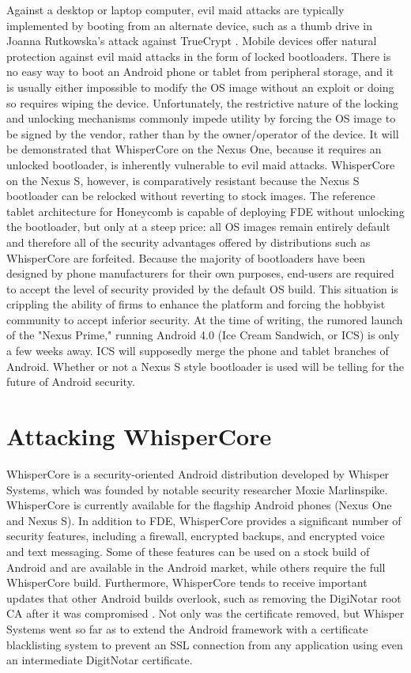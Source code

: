 Against a desktop or laptop computer, evil maid attacks are typically implemented by booting from an alternate device, such as a thumb drive in Joanna Rutkowska's attack against TrueCrypt \cite{evilmaid}. 
Mobile devices offer natural protection against evil maid attacks in the form of locked bootloaders. 
There is no easy way to boot an Android phone or tablet from peripheral storage, and it is usually either impossible to modify the OS image without an exploit or doing so requires wiping the device. 
Unfortunately, the restrictive nature of the locking and unlocking mechanisms commonly impede utility by forcing the OS image to be signed by the vendor, rather than by the owner/operator of the device. It will be demonstrated that WhisperCore on the Nexus One, because it requires an unlocked bootloader, is inherently vulnerable to evil maid attacks. 
WhisperCore on the Nexus S, however, is comparatively resistant because the Nexus S bootloader can be relocked without reverting to stock images. 
The reference tablet architecture for Honeycomb is capable of deploying FDE without unlocking the bootloader, but only at a steep price: all OS images remain entirely default and therefore all of the security advantages offered by distributions such as WhisperCore are forfeited. 
Because the majority of bootloaders have been designed by phone manufacturers for their own purposes, end-users are required to accept the level of security provided by the default OS build. 
This situation is crippling the ability of firms to enhance the platform and forcing the hobbyist community to accept inferior security. 
At the time of writing, the rumored launch of the "Nexus Prime," running Android 4.0 (Ice Cream Sandwich, or ICS) is only a few weeks away. 
ICS will supposedly merge the phone and tablet branches of Android. 
Whether or not a Nexus S style bootloader is used will be telling for the future of Android security. 

\section{Attacking WhisperCore}
WhisperCore is a security-oriented Android distribution developed by Whisper Systems, which was founded by notable security
researcher Moxie Marlinspike.  WhisperCore is currently available for the flagship Android phones (Nexus One and Nexus S). In
addition to FDE, WhisperCore provides a significant number of security features, including a firewall, encrypted backups, and
encrypted voice and text messaging.  Some of these features can be used on a stock build of Android and are available in the Android
market, while others require the full WhisperCore build.  Furthermore, WhisperCore tends to receive important updates that other
Android builds overlook, such as removing the DigiNotar root CA after it was compromised \cite{whispernotar}.  Not only was the
certificate removed, but Whisper Systems went so far as to extend the Android framework with a certificate blacklisting system to
prevent an SSL connection from any application using even an intermediate DigitNotar certificate. 

